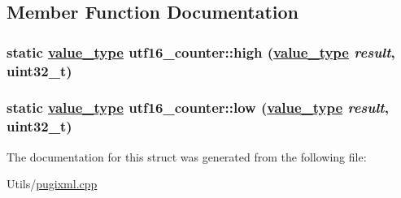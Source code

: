 \subsection{Member Function Documentation}
\hypertarget{structutf16__counter_c1a8793996e57dc28fd22f3165628e4d}{
\subsubsection[high]{\setlength{\rightskip}{0pt plus 5cm}static \hyperlink{structutf16__counter_0d63f9ca809d182b2f184ef93bd11107}{value\_\-type} utf16\_\-counter::high (\hyperlink{structutf16__counter_0d63f9ca809d182b2f184ef93bd11107}{value\_\-type} {\em result}, uint32\_\-t)}}
\label{structutf16__counter_c1a8793996e57dc28fd22f3165628e4d}


\hypertarget{structutf16__counter_4571f3d0fbf0ce763904ec3321dcb41e}{
\subsubsection[low]{\setlength{\rightskip}{0pt plus 5cm}static \hyperlink{structutf16__counter_0d63f9ca809d182b2f184ef93bd11107}{value\_\-type} utf16\_\-counter::low (\hyperlink{structutf16__counter_0d63f9ca809d182b2f184ef93bd11107}{value\_\-type} {\em result}, uint32\_\-t)}}
\label{structutf16__counter_4571f3d0fbf0ce763904ec3321dcb41e}




The documentation for this struct was generated from the following file:\begin{CompactItemize}
\item 
Utils/\hyperlink{pugixml_8cpp}{pugixml.cpp}\end{CompactItemize}
